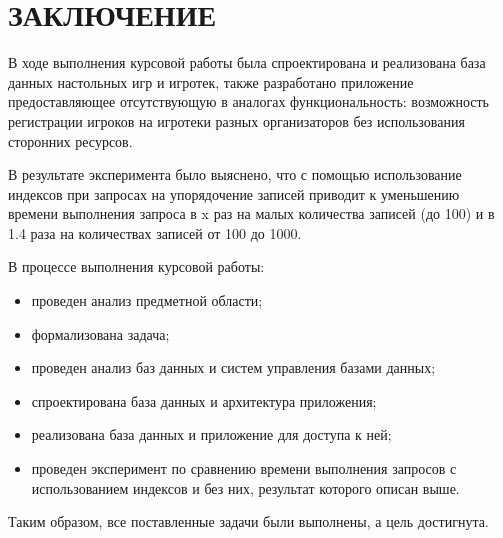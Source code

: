 \chapter*{ЗАКЛЮЧЕНИЕ}

В ходе выполнения курсовой работы была спроектирована и реализована база данных
настольных игр и игротек, также разработано приложение предоставляющее
отсутствующую в аналогах функциональность: возможность регистрации игроков на
игротеки разных организаторов без использования сторонних ресурсов.

В результате эксперимента было выяснено, что с помощью использование индексов
при запросах на упорядочение записей приводит к уменьшению времени выполнения
запроса в x раз на малых количества записей (до 100) и в 1.4 раза на количествах
записей от 100 до 1000.

В процессе выполнения курсовой работы:
\begin{itemize}
    \item проведен анализ предметной области;
    \item формализована задача;
    \item проведен анализ баз данных и систем управления базами данных;
    \item спроектирована база данных и архитектура приложения;
    \item реализована база данных и приложение для доступа к ней;
    \item проведен эксперимент по сравнению времени выполнения запросов с
        использованием индексов и без них, результат которого описан выше.
\end{itemize}

Таким образом, все поставленные задачи были выполнены, а цель достигнута.
